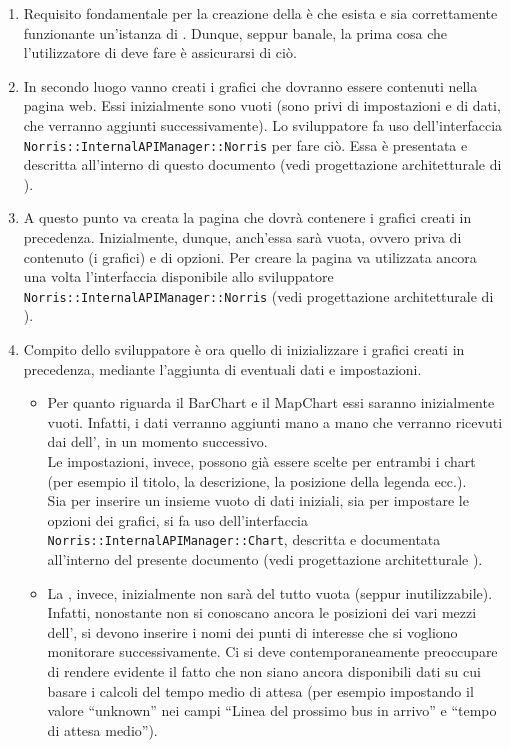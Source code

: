         \begin{enumerate}
            \item Requisito fondamentale per la creazione della  è che esista e sia correttamente funzionante un'istanza di . Dunque, seppur banale, la prima cosa che l'utilizzatore di  deve fare è assicurarsi di ciò.
            \item In secondo luogo vanno creati i grafici che dovranno essere contenuti nella pagina web. Essi inizialmente sono vuoti (sono privi di impostazioni e di dati, che verranno aggiunti successivamente). Lo sviluppatore fa uso dell'interfaccia \texttt{Norris::InternalAPIManager::Norris} per fare ciò. Essa è presentata e descritta all'interno di questo documento (vedi progettazione architetturale di ).
            \item A questo punto va creata la pagina che dovrà contenere i grafici creati in precedenza. Inizialmente, dunque, anch'essa sarà vuota, ovvero priva di contenuto (i grafici) e di opzioni. Per creare la pagina va utilizzata ancora una volta l'interfaccia disponibile allo sviluppatore \texttt{Norris::InternalAPIManager::Norris} (vedi progettazione architetturale di ).
            \item Compito dello sviluppatore è ora quello di inizializzare i grafici creati in precedenza, mediante l'aggiunta di eventuali dati e impostazioni.
            \begin{itemize}
                \item Per quanto riguarda il BarChart e il MapChart essi saranno inizialmente vuoti. Infatti, i dati verranno aggiunti mano a mano che verranno ricevuti dai  dell', in un momento successivo.\\
                Le impostazioni, invece, possono già essere scelte per entrambi i chart (per esempio il titolo, la descrizione, la posizione della legenda ecc.).\\
                Sia per inserire un insieme vuoto di dati iniziali, sia per impostare le opzioni dei grafici, si fa uso dell'interfaccia \texttt{Norris::InternalAPIManager::Chart}, descritta e documentata all'interno del presente documento (vedi progettazione architetturale ).
                \item La , invece, inizialmente non sarà del tutto vuota (seppur inutilizzabile). Infatti, nonostante non si conoscano ancora le posizioni dei vari mezzi dell', si devono inserire i nomi dei punti di interesse che si vogliono monitorare successivamente. Ci si deve contemporaneamente preoccupare di rendere evidente il fatto che non siano ancora disponibili dati su cui basare i calcoli del tempo medio di attesa (per esempio impostando il valore “unknown” nei campi “Linea del prossimo bus in arrivo” e “tempo di attesa medio”).\\

\end{itemize}
\end{enumerate}
